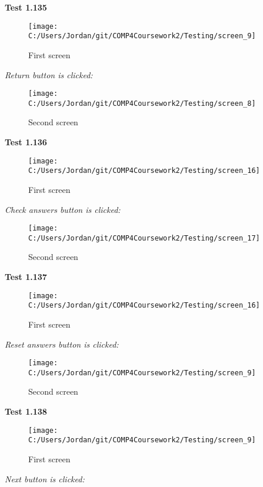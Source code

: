 \textbf{Test 1.135}

\begin{figure}[H]
    \label{fig: First Screen}\caption{First screen}
    \texttt{[image: C:/Users/Jordan/git/COMP4Coursework2/Testing/screen\_9]}
\end{figure}

\textit{Return button is clicked: }

\begin{figure}[H]
    \label{fig: Second Screen}\caption{Second screen}
    \texttt{[image: C:/Users/Jordan/git/COMP4Coursework2/Testing/screen\_8]}
\end{figure}

\textbf{Test 1.136}

\begin{figure}[H]
    \label{fig: First Screen}\caption{First screen}
    \texttt{[image: C:/Users/Jordan/git/COMP4Coursework2/Testing/screen\_16]}
\end{figure}

\textit{Check answers button is clicked: }

\begin{figure}[H]
    \label{fig: Second Screen}\caption{Second screen}
    \texttt{[image: C:/Users/Jordan/git/COMP4Coursework2/Testing/screen\_17]}
\end{figure}

\textbf{Test 1.137}

\begin{figure}[H]
    \label{fig: First Screen}\caption{First screen}
    \texttt{[image: C:/Users/Jordan/git/COMP4Coursework2/Testing/screen\_16]}
\end{figure}

\textit{Reset answers button is clicked: }

\begin{figure}[H]
    \label{fig: Second Screen}\caption{Second screen}
    \texttt{[image: C:/Users/Jordan/git/COMP4Coursework2/Testing/screen\_9]}
\end{figure}

\textbf{Test 1.138}

\begin{figure}[H]
    \label{fig: First Screen}\caption{First screen}
    \texttt{[image: C:/Users/Jordan/git/COMP4Coursework2/Testing/screen\_9]}
\end{figure}

\textit{Next button is clicked: }

